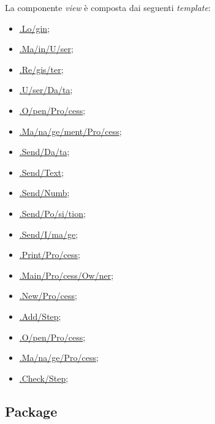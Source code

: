 La componente \textit{view} è composta dai seguenti \textit{template}:
\begin{itemize}
	\item \hyperref[loginTemplate]{\view{}.Lo\fshyp{}gin};
	\item \hyperref[mainUserTemplate]{\viewUser{}.Ma\fshyp{}in\fshyp{}U\fshyp{}ser};
	\item \hyperref[registerTemplate]{\viewUser{}.Re\fshyp{}gis\fshyp{}ter};
	\item \hyperref[userDataTemplate]{\viewUser{}.U\fshyp{}ser\fshyp{}Da\fshyp{}ta};
	\item \hyperref[openProcessTemplate]{\viewUser{}.O\fshyp{}pen\fshyp{}Pro\fshyp{}cess};
	\item \hyperref[managementProcessTemplate]{\viewUser{}.Ma\fshyp{}na\fshyp{}ge\fshyp{}ment\fshyp{}Pro\fshyp{}cess};
	\item \hyperref[sendDataTemplate]{\viewUser{}.Send\fshyp{}Da\fshyp{}ta};
	\item \hyperref[sendTextTemplate]{\viewUser{}.Send\fshyp{}Text};
	\item \hyperref[sendNumbTemplate]{\viewUser{}.Send\fshyp{}Numb};
	\item \hyperref[sendPositionTemplate]{\viewUser{}.Send\fshyp{}Po\fshyp{}si\fshyp{}tion};
	\item \hyperref[sendImageTemplate]{\viewUser{}.Send\fshyp{}I\fshyp{}ma\fshyp{}ge};
	\item \hyperref[printProcessTemplate]{\viewUser{}.Print\fshyp{}Pro\fshyp{}cess};
	\item \hyperref[mainProcessOwnerTemplate]{\viewAdmin{}.Main\fshyp{}Pro\fshyp{}cess\fshyp{}Ow\fshyp{}ner};
	\item \hyperref[newProcessTemplate]{\viewAdmin{}.New\fshyp{}Pro\fshyp{}cess};
	\item \hyperref[addStepTemplate]{\viewAdmin{}.Add\fshyp{}Step};
	\item \hyperref[openProcessTemplate]{\viewAdmin{}.O\fshyp{}pen\fshyp{}Pro\fshyp{}cess};
	\item \hyperref[manageProcessTemplate]{\viewAdmin{}.Ma\fshyp{}na\fshyp{}ge\fshyp{}Pro\fshyp{}cess};
	\item \hyperref[checkStepTemplate]{\viewAdmin{}.Check\fshyp{}Step};
\end{itemize}

\subsection{Package \view{}}

